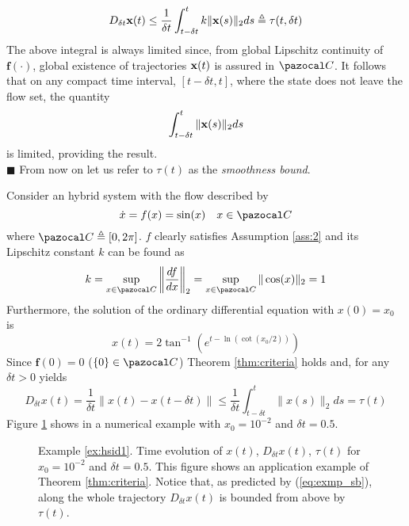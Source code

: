     \begin{equation}
        D_{\delta t}\mathbf{x}(t)\leq\frac{1}{\delta t}\int_{t-\delta t}^{t}k\|\mathbf{x}(s)\|_2ds\triangleq\tau(t,\delta t)
    \end{equation}
    The above integral is always limited since, from global Lipschitz continuity of $\mathbf{\mathbf{f}}(\cdot)$, global existence of trajectories $\mathbf{x}(t)$ is assured in $\C$. It follows that on any compact time interval, $[t-\delta t,t]$, where the state does not leave the flow set, the quantity
    \begin{equation}
        \int_{t- \delta t}^{t}\|\mathbf{x}(s)\|_2ds
    \end{equation}
    is limited, providing the result.\\
    $\blacksquare$
\endproof
%
From now on let us refer to $\tau(t)$ as the \textit{smoothness bound}.
%
\begin{exmp}\label{ex:hsid1}
	Consider an hybrid system with the flow described by 
	\begin{equation}
	    \dot{x}={{f}}(x)=\sin(x)\quad x\in\C
	\end{equation}
	where $\C\triangleq[0,2\pi]$. $f$ clearly satisfies Assumption \ref{ass:2} and its Lipschitz constant $k$ can be found as
	\begin{equation}
	    k=\sup\limits_{x\in\C}\left\|\frac{d {f}}{dx}\right\|_2=\sup\limits_{x\in\C}\|\cos(x)\|_2=1
	\end{equation}
	Furthermore, the solution of the ordinary differential equation with $x(0)=x_0$ is\
	\begin{equation}
	    x(t)= 2\tan^{-1}\left(e^{t-\ln(\cot(x_0/2))}\right)
	\end{equation}
	Since ${\mathbf{f}}(0)=0$ ($\{0\}\in\C$) Theorem \ref{thm:criteria} holds and, for any $\delta t>0$ yields
	\begin{equation}\label{eq:exmp_sb}
	    D_{\delta t}x(t)=\frac{1}{\delta t}\|x(t)-x(t-\delta t)\|\leq\frac{1}{\delta t}\int_{t-\delta t}^{t}\|x(s)\|_2ds=\tau(t)
	\end{equation}
	Figure \ref{fig:ex1} shows in a numerical example with $x_0=10^{-2}$ and $\delta t = 0.5$. 
	\begin{figure}[!t]
        \centering
        
        \caption[Example \ref{ex:hsid1}: Time evolution of the state, Euler derivative norm and smoothness bound.]{Example \ref{ex:hsid1}. Time evolution of $x(t)$, $D_{\delta t}x(t)$, $\tau(t)$ for $x_0=10^{-2}$ and $\delta t=0.5$. This figure shows an application example of Theorem \ref{thm:criteria}. Notice that, as predicted by (\ref{eq:exmp_sb}), along the whole trajectory $D_{\delta t}x(t)$ is bounded from above by $\tau(t)$.}
        \label{fig:ex1}
    \end{figure}
\end{exmp}

